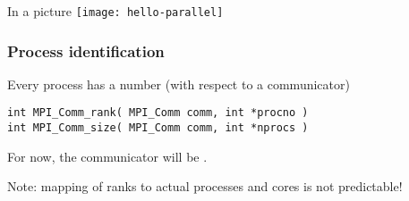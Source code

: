 \begin{frame}{In a picture}
  \texttt{[image: hello-parallel]}
\end{frame}

\begin{frame}[containsverbatim]\frametitle{Process identification}
  \label{sl:ranksize}
  Every process has a number (with respect to a communicator)
\begin{verbatim}
int MPI_Comm_rank( MPI_Comm comm, int *procno )
int MPI_Comm_size( MPI_Comm comm, int *nprocs )
\end{verbatim}
For now, the communicator will be .

Note: mapping of ranks to actual processes and cores is not predictable!
\end{frame}

